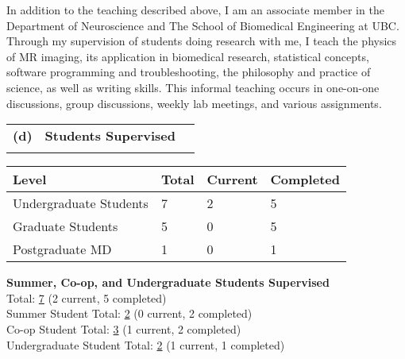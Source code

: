 \documentclass[11pt,notitlepage,english]{report}
\begin{document}
In addition to the teaching described above, I am an associate member in the Department of Neuroscience and The School of Biomedical Engineering at UBC. Through my supervision of students doing research with me, I teach the physics of MR imaging, its application in biomedical research, statistical concepts, software programming and troubleshooting, the philosophy and practice of science, as well as writing skills. This informal teaching occurs in one-on-one discussions, group discussions, weekly lab meetings, and various assignments.


\begin{tabular}{L{.5cm} L{8cm} L{6.9cm}}
  \\
  \textbf{(d)} & \textbf{Students Supervised} \\
  \\
\end{tabular}

\begin{table}[H]
  \label{8d. Students Supervised}
  \centering
  \begin{tabular}{|l|l|l|l|}
    \rowcolor[HTML]{EFEFEF}
    \hline
    Level                  & Total & Current & Completed \\
    \hline
    Undergraduate Students & 7     & 2       & 5         \\ \hline
    Graduate Students      & 5     & 0       & 5         \\
    \hline
    Postgraduate MD        & 1     & 0       & 1         \\
    \hline
  \end{tabular}
\end{table}

\noindent \textbf{Summer, Co-op, and Undergraduate Students Supervised}
\\

\noindent Total: \underline{7} (2 current, 5 completed) \\
Summer Student Total: \underline{2} (0 current, 2 completed) \\
Co-op Student Total: \underline{3} (1 current, 2 completed) \\
Undergraduate Student Total: \underline{2} (1 current, 1 completed) \\
\end{document}

